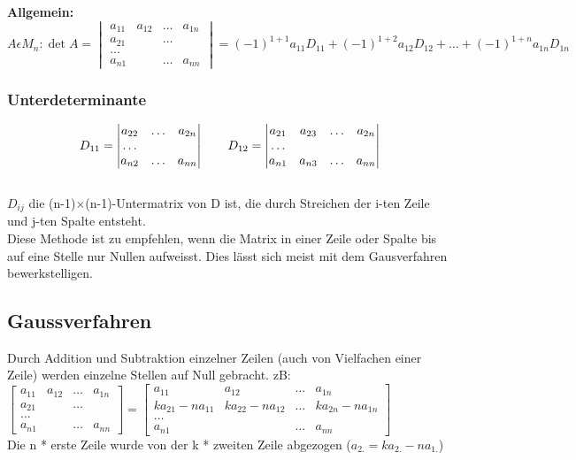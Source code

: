 	\textbf{Allgemein:}
	$$A\epsilon M_n: \det A =    
	\begin{vmatrix}
    	a_{11} & a_{12}& \ldots & a_{1n}\\
    	a_{21}& &\ldots & \\
    	\ldots \\
    	a_{n1} & & \ldots & a_{nn}    			
    \end{vmatrix}=
	(-1)^{1+1}a_{11}D_{11} + (-1)^{1+2}a_{12}D_{12}+ \ldots +
	(-1)^{1+n}a_{1n}D_{1n}$$
	
	\subsubsection{Unterdeterminante}
	$$D_{11}=
	\begin{vmatrix}
    	a_{22} & \ldots & a_{2n}\\
    	\ldots\\
    	a_{n2}& \ldots & a_{nn}
    \end{vmatrix} 	\\
	\qquad
	D_{12}=
	\begin{vmatrix}
    	a_{21} & a_{23}& \ldots & a_{2n}\\
    	\ldots\\
    	a_{n1}& a_{n3}&\ldots & a_{nn}
    \end{vmatrix}$$\\
	$D_{ij}$ die (n-1)$ \times $(n-1)-Untermatrix von D ist, die durch Streichen der
	i-ten Zeile und j-ten Spalte entsteht.\\
	Diese Methode ist zu empfehlen, wenn die Matrix in einer Zeile oder Spalte
	bis auf eine Stelle nur Nullen aufweisst.
	Dies lässt sich meist mit dem Gausverfahren bewerkstelligen.
	
\subsection{Gaussverfahren}
	Durch Addition und Subtraktion einzelner Zeilen (auch von Vielfachen einer
	Zeile) werden einzelne Stellen auf Null gebracht. zB:\\
	$\begin{bmatrix}
    	a_{11} & a_{12}& \ldots & a_{1n}\\
    	a_{21}& &\ldots & \\
    	\ldots \\
    	a_{n1} & & \ldots & a_{nn}    			
    \end{bmatrix}=
	\begin{bmatrix}
    	a_{11} & a_{12}& \ldots & a_{1n}\\
    	k a_{21}-n a_{11}& ka_{22}-n a_{12}&\ldots & k a_{2n} - n a_{1n}\\
    	\ldots \\
    	a_{n1} & & \ldots & a_{nn}    			
    \end{bmatrix}$ \\
	Die n * erste Zeile wurde von der k * zweiten Zeile abgezogen ($a_{2.}= 
	k a_{2.}- n a_{1.}$)
	
